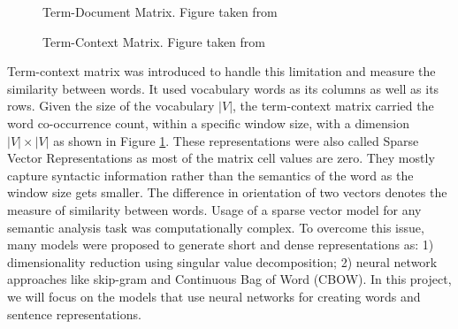 \documentclass[12pt]{report} %
\begin{document}
\begin{figure}[!tbp]
	\centering
	\begin{minipage}[b]{0.99\textwidth}
		\centering
		\caption{ Term-Document Matrix. Figure taken from \cite{jurafsky2014speech}}
		\label{doc-word}
	\end{minipage}
	\begin{minipage}[b]{0.99\textwidth}
		\centering
		\caption{Term-Context Matrix. Figure taken from \cite{jurafsky2014speech}}
		\label{word-word}
	\end{minipage}
\end{figure}

Term-context matrix was introduced to handle this limitation and measure the similarity between words.  It used vocabulary words as its columns as well as its rows. Given the size of the vocabulary $|V|$, the term-context matrix carried the word co-occurrence count, within a specific window size,  with a dimension $|V| \times |V|$ as shown in Figure \ref{word-word}. These representations were also called Sparse Vector Representations as most of the matrix cell values are zero. They mostly capture syntactic information rather than the semantics of the word as the window size gets smaller. The difference in orientation of two vectors denotes the measure of similarity between words. Usage of a sparse vector model for any semantic analysis task was computationally complex. To overcome this issue, many models were proposed to generate short and dense representations as: 1) dimensionality reduction using singular value decomposition; 2) neural network approaches like skip-gram and Continuous Bag of Word (CBOW). In this project, we will focus on the models that use neural networks for creating words and sentence representations.
\end{document}
